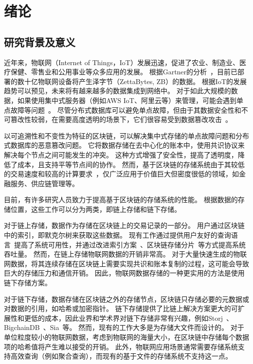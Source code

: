 
\chapter{绪论}
\section{研究背景及意义}
近年来，物联网（Internet of Things，IoT）发展迅速，促进了农业、制造业、医疗保健、零售业和公用事业等众多应用的发展。
根据Gartner的分析~\cite{hung2017leading}，目前已部署的数十亿物联网设备将产生泽字节（ZettaBytes, ZB）的数据。
根据IoT的发展趋势可以预见，未来将有越来越多的数据集成到网络中。
对于如此大规模的数据，如果使用集中式服务器（例如AWS IoT、阿里云等）来管理，可能会遇到单点故障等问题~\cite{gill2011understanding}。
尽管分布式数据库可以避免单点故障，但由于其数据安全性和不可篡改性较弱，在需要高度透明的场景下，它们很容易受到数据篡改攻击~\cite{chen2022blockchain}。

以可追溯性和不变性为特征的区块链，可以解决集中式存储的单点故障问题和分布式数据库的恶意篡改问题。
它将数据存储在去中心化的账本中，使用共识协议来解决每个节点之间可能发生的冲突。
这种方式增强了安全性，提高了透明度，降低了成本，且支持平等节点间的协作。
然而，基于区块链的存储系统由于其较低的交易速度和较高的计算要求~\cite{dorri2017towards}，仅广泛应用于价值巨大但密度很低的领域，如金融服务、供应链管理等。

目前，有许多研究人员致力于提高基于区块链的存储系统的性能。
根据数据的存储位置，这些工作可以分为两类，即链上存储和链下存储。

对于链上存储，数据作为存储在区块链上的交易记录的一部分。
用户通过区块链中的索引，即默克尔树来获取这些数据。
现有工作通过提供用户友好的查询语言~\cite{zhu2019sebdb,xu2019vchain,wang2022vchain+}提高了系统可用性，并通过改进索引方案~\cite{li2023lvmt,zhang2024cole}、区块链存储分片~\cite{zamani2018rapidchain,hong2023gridb,el2019blockchaindb}等方式提高系统吞吐量。
然而，在链上存储物联网数据的开销非常高。
对于大量快速生成的物联网数据，将其连续存储在区块链上需要实现共识和账本复制的过程，这可能会导致巨大的存储压力和通信开销。
因此，物联网数据存储的一种更实用的方法是使用链下存储方案。

对于链下存储，数据存储在区块链之外的存储节点，区块链只存储必要的元数据或对数据的引用，如哈希或加密指针。
链下存储提供了比链上解决方案更大的可扩展性和更低的成本，因此业界和学术界对链下存储非常有兴趣，例如Storj~\cite{storj2018storj}、BigchainDB~\cite{mcconaghy2016bigchaindb}、Sia~\cite{sia}等。
然而，现有的工作大多是为存储大文件而设计的。
对于单位粒度较小的物联网数据，考虑到物联网的海量大小，在区块链中存储每个数据项的哈希值将产生难以接受的开销。
此外，物联网应用场景通常需要存储系统支持高效查询（例如聚合查询），而现有的基于文件的存储系统不支持这一点。


